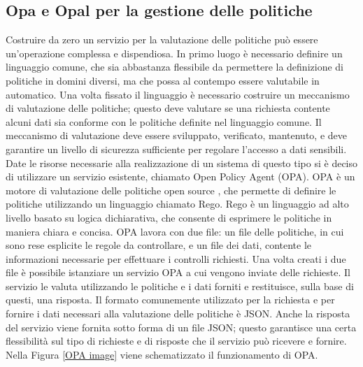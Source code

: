 \documentclass[a4paper,12pt]{report}
\begin{document}
\subsection{Opa e Opal per la gestione delle politiche}\label{opa_opal}
Costruire da zero un servizio per la valutazione delle politiche può essere un'operazione complessa e dispendiosa.
In primo luogo è necessario definire un linguaggio comune, che sia abbastanza flessibile da permettere la definizione di politiche in domini diversi, ma che possa al contempo essere valutabile in automatico.
Una volta fissato il linguaggio è necessario costruire un meccanismo di valutazione delle politiche; questo deve valutare se una richiesta contente alcuni dati sia conforme con le politiche definite nel linguaggio comune. 
Il meccanismo di valutazione deve essere sviluppato, verificato, mantenuto, e deve garantire un livello di sicurezza sufficiente per regolare l'accesso a dati sensibili.
Date le risorse necessarie alla realizzazione di un sistema di questo tipo si è deciso di utilizzare un servizio esistente, chiamato Open Policy Agent (OPA).
OPA è un motore di valutazione delle politiche open source \cite{noauthor_open_nodate}, che permette di definire le politiche utilizzando un linguaggio chiamato Rego.
Rego è un linguaggio ad alto livello basato su logica dichiarativa, che consente di esprimere le politiche in maniera chiara e concisa.
OPA lavora con due file: un file delle politiche, in cui sono rese esplicite le regole da controllare, e un file dei dati, contente le informazioni necessarie per effettuare i controlli richiesti.
Una volta creati i due file è possibile istanziare un servizio OPA a cui vengono inviate delle richieste.
Il servizio le valuta utilizzando le politiche e i dati forniti e restituisce, sulla base di questi, una risposta.
Il formato comunemente utilizzato per la richiesta e per fornire i dati necessari alla valutazione delle politiche è JSON.
Anche la risposta del servizio viene fornita sotto forma di un file JSON; questo garantisce una certa flessibilità sul tipo di richieste e di risposte che il servizio può ricevere e  fornire.
Nella Figura \ref{OPA image} viene schematizzato il funzionamento di OPA.
\end{document}
